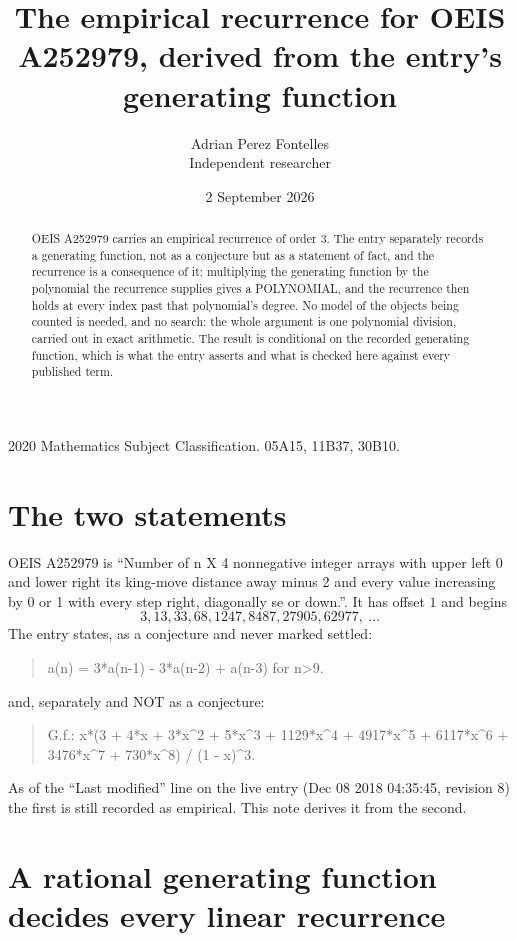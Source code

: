 \documentclass[11pt,a4paper]{article}
\title{The empirical recurrence for OEIS A252979, derived from the entry's generating function}
\author{Adrian Perez Fontelles\\ \small Independent researcher}
\date{2 September 2026}
\theoremstyle{plain}
\theoremstyle{definition}
\begin{document}
\maketitle

\begin{abstract}
OEIS A252979 carries an empirical recurrence of order $3$. The entry separately records a
generating function, not as a conjecture but as a statement of fact, and the recurrence is a
consequence of it: multiplying the generating function by the polynomial the recurrence
supplies gives a POLYNOMIAL, and the recurrence then holds at every index past that
polynomial's degree. No model of the objects being counted is needed, and no search: the
whole argument is one polynomial division, carried out in exact arithmetic. The result is
conditional on the recorded generating function, which is what the entry asserts and what is
checked here against every published term.
\end{abstract}

\noindent\small 2020 Mathematics Subject Classification. 05A15, 11B37, 30B10.\normalsize

\section{The two statements}

OEIS A252979 is ``Number of n X 4 nonnegative integer arrays with upper left 0 and lower right its king-move distance away minus 2 and every value increasing by 0 or 1 with every step right, diagonally se or down.''. It has offset $1$ and begins
\[
3, 13, 33, 68, 1247, 8487, 27905, 62977,\ \dots
\]
The entry states, as a conjecture and never marked settled:
\begin{quote}
a(n) = 3*a(n-1) - 3*a(n-2) + a(n-3) for n>9.
\end{quote}
and, separately and NOT as a conjecture:
\begin{quote}
G.f.: x*(3 + 4*x + 3*x\^{}2 + 5*x\^{}3 + 1129*x\^{}4 + 4917*x\^{}5 + 6117*x\^{}6 + 3476*x\^{}7 + 730*x\^{}8) / (1 - x)\^{}3.
\end{quote}
As of the ``Last modified'' line on the live entry (Dec 08 2018 04:35:45, revision 8) the first is still
recorded as empirical. This note derives it from the second.

\section{A rational generating function decides every linear recurrence}
\end{document}
